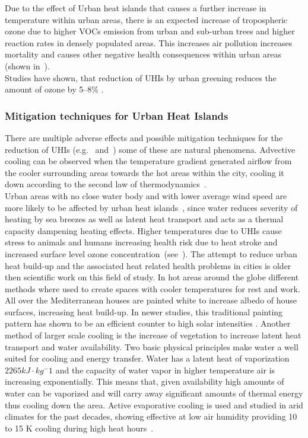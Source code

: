 \documentclass[12pt,a4paper, english,twoside]{scrartcl}
\begin{document}
      Due to the effect of Urban heat islands that causes a further increase in temperature within urban areas, there is an expected increase of tropospheric ozone due to higher \glspl{VOC} emission from urban and sub-urban trees and higher reaction rates in densely populated areas. 
      This increases air pollution increases mortality and causes other negative health consequences within urban areas (shown in~\cite{Ebi2008}).\\ 
      Studies have shown, that reduction of \glspl{UHI} by urban greening reduces the amount of ozone by 5--8\% \autocite[p.209]{Fallmann2016}. 
    \subsubsection{Mitigation techniques for Urban Heat Islands}\label{ssec:mitigation}
      There are multiple adverse effects and possible mitigation techniques for the reduction of \glspl{UHI} (e.g.~\cite{Nichol1994} and~\cite{Stewart2011}) some of these are natural phenomena. %
      Advective cooling can be observed when the temperature gradient generated airflow from the cooler surrounding areas towards the hot areas within the city, cooling it down according to the second law of thermodynamics~\autocite{HaegerEugensson1999}. \\
      Urban areas with no close water body  and with lower average wind speed are more likely to be affected by urban heat islands~\autocite{Ramamurthy2017}, since water reduces severity of heating by sea breezes as well as latent heat transport and acts as a thermal capacity dampening heating effects. 
      Higher temperatures due to \glspl{UHI} cause stress to animals and humans increasing health risk due to heat stroke and increased surface level ozone concentration~(see~\cite{Santamouris2020}).%
      The attempt to reduce urban heat build-up and the associated heat related health problems in cities is older then scientific work on this field of study. 
      In hot areas around the globe different methods where used to create spaces with cooler temperatures for rest and work. 
      All over the Mediterranean houses are painted white to increase albedo of house surfaces, increasing heat build-up. 
      In newer studies, this traditional painting pattern has shown to be an efficient counter to high solar intensities \autocite{Fayad2021}.
      Another method of larger scale cooling is the increase of vegetation to increase latent heat transport and water availability.
      Two basic physical principles make water a well suited for cooling and energy transfer.
      Water has a latent heat of vaporization $2265 kJ\cdot kg^-1$ and the capacity of water vapor in higher temperature air is increasing exponentially.
      This means that, given availability high amounts of water can be vaporized and will carry away significant amounts of thermal energy thus cooling down the area. 
      Active evaporative cooling is used and studied in arid climates for the past decades, showing effective at low air humidity providing 10 to 15 K cooling during high heat hours~\autocite{Vanos2022}.
\end{document}
